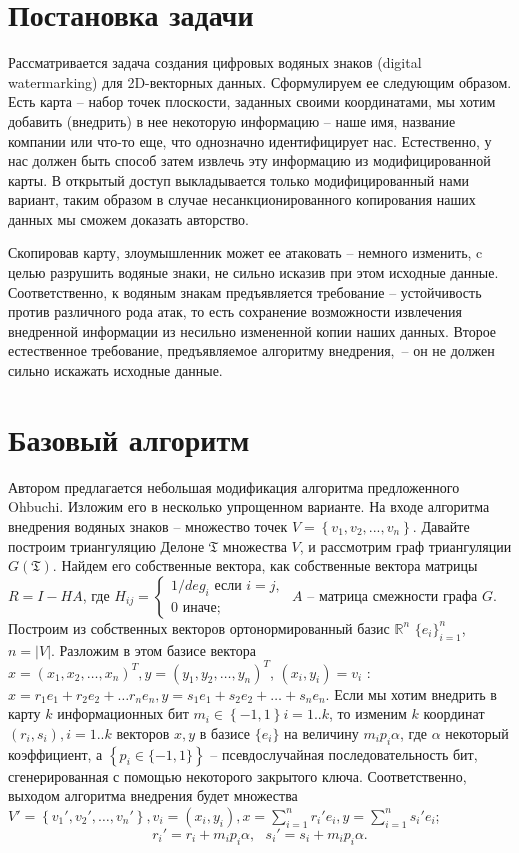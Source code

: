 \documentclass{article}
\begin{document}
\section{Постановка задачи}
Рассматривается задача создания цифровых водяных знаков (digital watermarking) для 2D-векторных данных. Сформулируем ее следующим образом. Есть карта -- набор точек плоскости, заданных своими координатами, мы хотим добавить (внедрить) в нее некоторую информацию -- наше имя, название компании или что-то еще, что однозначно идентифицирует нас.
Естественно, у нас должен быть способ затем извлечь эту информацию из модифицированной карты.
В открытый доступ выкладывается только модифицированный нами вариант, таким образом в случае несанкционированного копирования наших данных мы сможем доказать авторство. 

Скопировав карту, злоумышленник может ее атаковать -- немного изменить, c целью разрушить водяные знаки, не сильно исказив при этом исходные данные. Соответственно, к водяным знакам предъявляется требование -- устойчивость против различного рода атак, то есть сохранение возможности извлечения внедренной информации из несильно измененной копии наших данных. 
Второе естественное требование, предъявляемое алгоритму внедрения,~-- он не должен сильно искажать исходные данные.

\section{Базовый алгоритм}
Автором предлагается небольшая модификация алгоритма предложенного Ohbuchi. Изложим его в несколько упрощенном варианте.
На входе алгоритма внедрения водяных знаков -- множество точек $V = \left\{v_1, v_2, ... , v_n\right\}$. Давайте построим триангуляцию Делоне $\mathfrak{T}$ множества $V$, и рассмотрим граф триангуляции $G(\mathfrak{T})$. Найдем его собственные вектора, как собственные вектора матрицы $R = I - HA$, где 
$H_{ij} = \begin{cases} 1 / deg_i\mbox{ если }i = j, \\ 0\mbox{ иначе;} \end{cases}$ $A$ -- матрица смежности графа $G$. Построим из собственных векторов ортонормированный базис $\mathbb{R}^n$ 
$\{e_i\}_{i=1}^n$, $n = |V|$. Разложим в этом базисе вектора $x = (x_1, x_2, \dots, x_n)^T, y = (y_1, y_2, \dots, y_n)^T$, $(x_i, y_i) = v_i$ : $x = r_1 e_1 + r_2 e_2 + \dots r_n e_n, 
y = s_1 e_1 + s_2 e_2 + \dots + s_n e_n$. Если мы хотим внедрить в карту $k$  информационных бит $m_i \in \left\{-1, 1 \right\} i = 1..k$, то изменим $k$ координат $(r_i, s_i), i = 1..k$ 
векторов $x, y$ в базисе $\{e_i\}$ на величину $m_i p_i \alpha$, где $\alpha$ некоторый коэффициент, а $\left\{p_i \in \{-1, 1\} \right\}$ -- псевдослучайная последовательность бит, 
сгенерированная с помощью некоторого закрытого ключа. Соответственно, выходом алгоритма внедрения будет множества $V' = \left\{ v_1', v_2', \dots , v_n' \right\}, v_i = (x_i, y_i), 
x = \sum_{i=1}^n r_i' e_i, y = \sum_{i=1}^n s_i' e_i$; \begin{equation}\label{MainFormul} r_i' = r_i + m_i p_i \alpha,\mbox{  } s_i' = s_i + m_i p_i \alpha. \end{equation}
\end{document}
